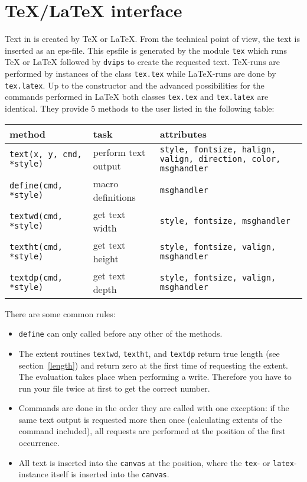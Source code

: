 \section{\TeX/\LaTeX{} interface}
\label{tex}
Text in \PyX{} is created by \TeX{} or \LaTeX. From the technical point
of view, the text is inserted as an eps-file. This epsfile is generated
by the module \verb|tex| which runs \TeX{} or \LaTeX{} followed by
\verb|dvips| to create the requested text. \TeX-runs are performed by
instances of the class \verb|tex.tex| while \LaTeX-runs are done by
\verb|tex.latex|. Up to the constructor and the advanced possibilities
for the commands performed in \LaTeX{} both classes \verb|tex.tex| and
\verb|tex.latex| are identical. They provide 5 methods to the user
listed in the following table:

\bigskip
\begin{tabularx}{\linewidth}{ll>{\raggedright\arraybackslash}X}
method&task&attributes\\
\hline
\texttt{text(x, y, cmd, *style)}&perform text output&\texttt{style, fontsize, halign, valign, direction, color, msghandler}\\
\texttt{define(cmd, *style)}&macro definitions&\texttt{msghandler}\\
\texttt{textwd(cmd, *style)}&get text width&\texttt{style, fontsize, msghandler}\\
\texttt{textht(cmd, *style)}&get text height&\texttt{style, fontsize, valign, msghandler}\\
\texttt{textdp(cmd, *style)}&get text depth&\texttt{style, fontsize, valign, msghandler}\\
\end{tabularx}
\bigskip

There are some common rules:
\begin{itemize}
\item \verb|define| can only called before any other of the methods.
\item The extent routines \verb|textwd|, \verb|textht|, and
\verb|textdp| return true \PyX{} length (see section~\ref{length})
and return zero at the first time of requesting the extent. The
evaluation takes place when performing a write. Therefore you have to
run your file twice at first to get the correct number.
\item Commands are done in the order they are called with one exception:
if the same text output is requested more then once (calculating extents
of the command included), all requests are performed at the position of
the first occurrence.
\item All text is inserted into the \verb|canvas| at the position, where
the \verb|tex|- or \verb|latex|-instance itself is inserted into the
\verb|canvas|.
\end{itemize}

